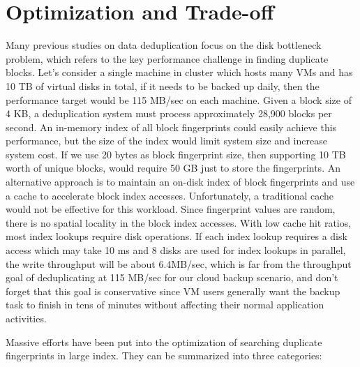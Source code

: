 \section{Optimization and Trade-off}
\label{back:optm}
Many previous studies on data deduplication focus on the disk bottleneck problem,
which refers to the key performance challenge in finding duplicate blocks.
Let's consider a single machine in cluster which hosts many VMs and has 10 TB of virtual disks in total,
if it needs to be backed up daily, then the performance target would be 115 MB/sec on each machine.
Given a block size of 4 KB, a deduplication system must process approximately 28,900 blocks per second.
An in-memory index of all block fingerprints could easily achieve this performance, but the size of the index would limit system size and increase system cost.
If we use 20 bytes as block fingerprint size, then supporting 10 TB worth of unique blocks, would require 50 GB just to store the fingerprints.
An alternative approach is to maintain an on-disk index of block fingerprints and use a cache to accelerate block index accesses. Unfortunately, a traditional cache would not be effective for this workload. Since fingerprint values are random, there is no spatial locality in the block index accesses.
With low cache hit ratios, most index lookups require disk operations. If each index lookup requires a disk access which may take 10 ms and 8 disks are used for index lookups in parallel, the write throughput will be about 6.4MB/sec, which is far from the throughput goal of deduplicating at 115 MB/sec for our cloud backup scenario, and don't forget that this goal
is conservative since VM users generally want the backup task to finish in tens of minutes without affecting their normal
application activities.

Massive efforts have been put into the optimization of searching duplicate
fingerprints in large index. They can be summarized into three categories:

